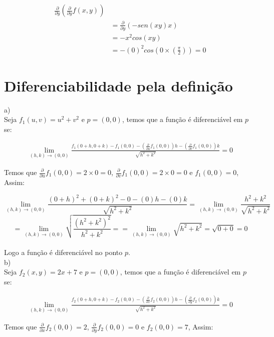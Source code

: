 \documentclass[11pt]{article}
\begin{document}
\begin{align*}
\frac{\partial}{\partial y} \left(\frac{\partial}{\partial y} f(x, y) \right)\\
& = \frac{\partial}{\partial y} (-sen(xy)x)\\
& = -x^2cos(xy)\\
& = -(0)^2cos(0 \times \left( \frac{\pi}{2} \right)) = 0
\end{align*}

\section{Diferenciabilidade pela definição}
a)\\
Seja $f_1(u, v) = u^2 + v^2$ e $p = (0, 0)$, temos que a função é diferenciável em $p$ se:

\begin{align*}
\lim_{(h, k) \rightarrow (0, 0)} \frac{f_1(0+h, 0+k) - f_1(0, 0) - \left(\frac{\partial}{\partial u} f_1(0, 0) \right)h - \left(\frac{\partial}{\partial v} f_1(0, 0) \right)k}{\sqrt{h^2 + k^2}} = 0
\end{align*}

Temos que $\frac{\partial}{\partial u} f_1(0, 0) = 2 \times 0 = 0$, $\frac{\partial}{\partial v} f_1(0, 0) = 2 \times 0 = 0$ e $f_1(0, 0) = 0$, Assim:

$$\lim_{(h, k) \rightarrow (0, 0)} \frac{(0+h)^2 + (0+k)^2 - 0 -(0)h - (0)k}{\sqrt{h^2 + k^2}} =  \lim_{(h, k) \rightarrow (0, 0)} \frac{h^2 + k^2}{\sqrt{h^2 + k^2}}$$
$$ = \lim_{(h, k) \rightarrow (0, 0)} \sqrt{\frac{(h^2 + k^2)^2}{h^2 + k^2}} = = \lim_{(h, k) \rightarrow (0, 0)} \sqrt{h^2 + k^2} = \sqrt{0 + 0} = 0$$\\

Logo a função é diferenciável no ponto $p$.\\

b)\\
Seja $f_2(x, y) = 2x + 7$ e $p = (0, 0)$, temos que a função é diferenciável em $p$ se:

\begin{align*}
\lim_{(h, k) \rightarrow (0, 0)} \frac{f_2(0+h, 0+k) - f_2(0, 0) - \left(\frac{\partial}{\partial x} f_2(0, 0) \right)h - \left(\frac{\partial}{\partial y} f_2(0, 0) \right)k}{\sqrt{h^2 + k^2}} = 0
\end{align*}

Temos que $\frac{\partial}{\partial x} f_2(0, 0) = 2$, $\frac{\partial}{\partial y} f_2(0, 0)  = 0$ e $f_2(0, 0) = 7$, Assim:
\end{document}
